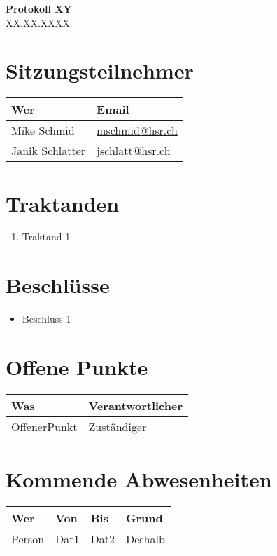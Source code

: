 \documentclass[
	ngerman,
	toc=listof, %
	toc=bibliography, %
	footnotes=multiple, %
	parskip=half, %
	numbers=noendperiod %
]{scrartcl}
\newcommand{\titel}{Protokoll XY}
\newcommand{\datum}{XX.XX.XXXX}
\begin{document}
\begin{center}
    \LARGE \textbf{\titel} \\[2ex]
    \large \datum \\[2ex]
\end{center}

\section*{Sitzungsteilnehmer}
\begin{tabularx}{0.9\linewidth}{Xl}
	\toprule
	Wer & Email \\
	\midrule
	Mike Schmid & \scriptsize \url{mschmid@hsr.ch}\\
	Janik Schlatter & \scriptsize \url{jschlatt@hsr.ch} \\
	\bottomrule
\end{tabularx}

\section*{Traktanden}
\begin{enumerate}
    \item Traktand 1
\end{enumerate}

\section*{Beschlüsse}
\begin{itemize}
    \item Beschluss 1
\end{itemize}

\section*{Offene Punkte}
\begin{tabularx}{0.9\linewidth}{Xl}
	\toprule
	Was & Verantwortlicher \\
	\midrule
	OffenerPunkt & Zuständiger \\
	\bottomrule
\end{tabularx}

\section*{Kommende Abwesenheiten}
\begin{tabularx}{0.9\linewidth}{lllX}
	\toprule
	Wer & Von & Bis & Grund \\
	\midrule
	Person & Dat1 & Dat2 & Deshalb \\
	\bottomrule
\end{tabularx}
\end{document}
